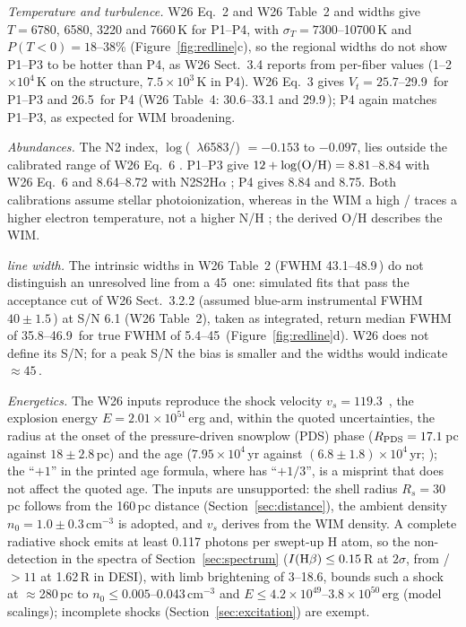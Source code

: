 \textit{Temperature and turbulence.} W26 Eq.~2 \citep{Reynolds1977} and W26 Table~2 \Ha{} and \Nii{} widths give $T=6780$, 6580, 3220 and 7660\,K for P1--P4, with $\sigma_T=7300$--10700\,K and $P(T<0)=18$--38\% (Figure~\ref{fig:redline}c), so the regional widths do not show P1--P3 to be hotter than P4, as W26 Sect.~3.4 reports from per-fiber values (1--2$\times10^4$\,K on the structure, $7.5\times10^3$\,K in P4). W26 Eq.~3 gives $V_t=25.7$--29.9\,\kms{} for P1--P3 and 26.5\,\kms{} for P4 (W26 Table~4: 30.6--33.1 and 29.9\,\kms); P4 again matches P1--P3, as expected for WIM broadening.

\textit{Abundances.} The N2 index, $\log$(\Nii~$\lambda$6583/\Ha) $=-0.153$ to $-0.097$, lies outside the calibrated range of W26 Eq.~6 \citep[$-2.5<{\rm N2}<-0.3$;][]{Pettini2004}. P1--P3 give $12+\log({\rm O/H})=8.81$--8.84 with W26 Eq.~6 and 8.64--8.72 with N2S2H$\alpha$ \citep{Dopita2016}; P4 gives 8.84 and 8.75. Both calibrations assume stellar photoionization, whereas in the WIM a high \Nii/\Ha{} traces a higher electron temperature, not a higher N/H \citep{Haffner1999,Madsen2006}; the derived O/H describes the WIM.

\textit{\Oiii{} line width.} The intrinsic \Oiii{} widths in W26 Table~2 (FWHM 43.1--48.9\,\kms) do not distinguish an unresolved line from a 45\,\kms{} one: simulated fits that pass the acceptance cut of W26 Sect.~3.2.2 (assumed blue-arm instrumental FWHM $40\pm1.5$\,\kms) at S/N 6.1 (W26 Table~2), taken as integrated, return median FWHM of 35.8--46.9\,\kms{} for true FWHM of 5.4--45\,\kms{} (Figure~\ref{fig:redline}d). W26 does not define its S/N; for a peak S/N the bias is smaller and the widths would indicate $\approx45$\,\kms.

\textit{Energetics.} The W26 inputs reproduce the shock velocity $v_s=119.3$\,\kms{} \citep{Dopita1979}, the explosion energy $E=2.01\times10^{51}$\,erg \citep{Boumis2022} and, within the quoted uncertainties, the radius at the onset of the pressure-driven snowplow (PDS) phase ($R_{\rm PDS}=17.1$\,pc against $18\pm2.8$\,pc) and the age ($7.95\times10^4$\,yr against $(6.8\pm1.8)\times10^4$\,yr; \citealt{Cioffi1988}); the ``$+1$'' in the printed age formula, where \citet{Cioffi1988} has ``$+1/3$'', is a misprint that does not affect the quoted age. The inputs are unsupported: the shell radius $R_s=30$\,pc follows from the 160\,pc distance (Section~\ref{sec:distance}), the ambient density $n_0=1.0\pm0.3$\,cm$^{-3}$ is adopted, and $v_s$ derives from the WIM \Sii{} density. A complete radiative shock emits at least 0.117 \Hb{} photons per swept-up H atom, so the \Hb{} non-detection in the spectra of Section~\ref{sec:spectrum} ($I({\rm H}\beta)\le0.15$\,R at $2\sigma$, from \Oiii/\Hb{} $>11$ at 1.62\,R in DESI), with limb brightening of 3--18.6, bounds such a shock at $\approx$280\,pc to $n_0\le0.005$--0.043\,cm$^{-3}$ and $E\le4.2\times10^{49}$--$3.8\times10^{50}$\,erg (model scalings); incomplete shocks (Section~\ref{sec:excitation}) are exempt.

